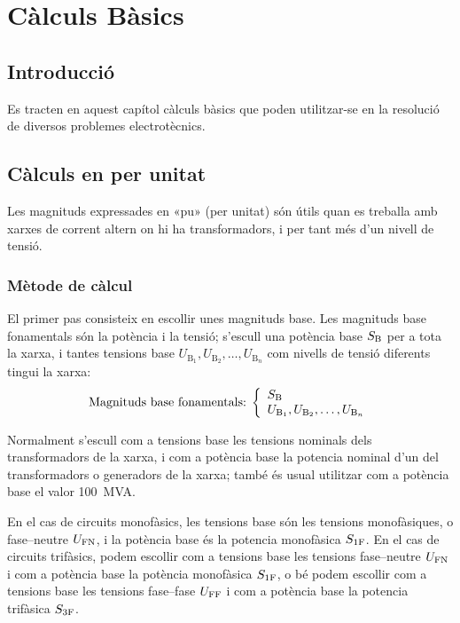 \chapter{Càlculs Bàsics}\label{sec:calc_bas}

\section{Introducció}
Es tracten en aquest capítol càlculs bàsics que poden utilitzar-se en la
resolució de diversos problemes electrotècnics.



\section{Càlculs en per unitat} \label{sec:seccio_pu} 

Les magnituds expressades en «pu» (per unitat) són útils quan es treballa
amb xarxes de corrent altern on hi ha transformadors, i per tant més d'un nivell de tensió.

\subsection{Mètode de càlcul} 

 El primer pas consisteix en
escollir unes magnituds base. Les magnituds base fonamentals són la
potència i la tensió; s'escull una potència base $S_\mathrm{B}$ per a
tota la xarxa, i tantes tensions base $U_{\text{B}_1}, U_{\text{B}_2}, \ldots,
U_{\text{B}_n}$ com nivells de tensió
diferents tingui la xarxa:
\begin{equation}
   \text{Magnituds base fonamentals:}\;\left\{
\begin{array}{l}
   S_\mathrm{B} \\
   U_{\text{B}_1}, U_{\text{B}_2}, \ldots, U_{\text{B}_n}
\end{array}
\right.
\end{equation}

Normalment s'escull com a tensions base les tensions nominals dels transformadors de la
xarxa, i com a potència base la potencia nominal d'un del transformadors o generadors de la xarxa; també és usual utilitzar com a potència base el valor \SI{100}{MVA}.

En el cas de circuits monofàsics, les tensions base són les tensions monofàsiques, o fase--neutre $U_\mathrm{FN}$, i la potència base és la potencia monofàsica $S_\mathrm{1F}$. En el cas de circuits trifàsics, podem escollir com a tensions base les tensions fase--neutre $U_\mathrm{FN}$ i com a potència base la potència  monofàsica $S_\mathrm{1F}$, o bé podem escollir com a tensions base les tensions fase--fase $U_\mathrm{FF}$ i com a potència base la potencia trifàsica $S_\mathrm{3F}$.

